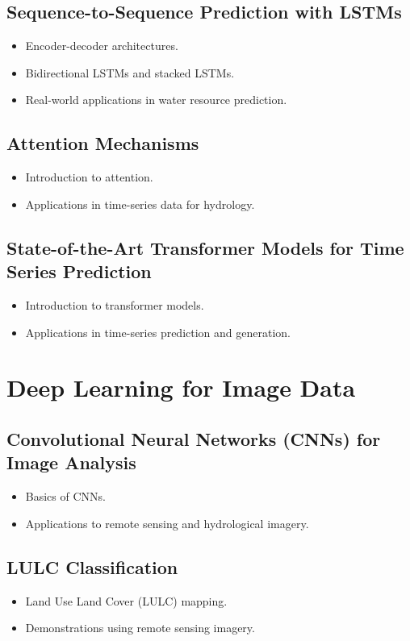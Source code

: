\chapter{Sequence-to-Sequence Prediction with LSTMs}
\begin{itemize}
    \item Encoder-decoder architectures.
    \item Bidirectional LSTMs and stacked LSTMs.
    \item Real-world applications in water resource prediction.
\end{itemize}

\chapter{Attention Mechanisms}
\begin{itemize}
    \item Introduction to attention.
    \item Applications in time-series data for hydrology.
\end{itemize}

\chapter{State-of-the-Art Transformer Models for Time Series Prediction}
\begin{itemize}
    \item Introduction to transformer models.
    \item Applications in time-series prediction and generation.
\end{itemize}

\part{Deep Learning for Image Data}

\chapter{Convolutional Neural Networks (CNNs) for Image Analysis}
\begin{itemize}
    \item Basics of CNNs.
    \item Applications to remote sensing and hydrological imagery.
\end{itemize}

\chapter{LULC Classification}
\begin{itemize}
    \item Land Use Land Cover (LULC) mapping.
    \item Demonstrations using remote sensing imagery.
\end{itemize}

